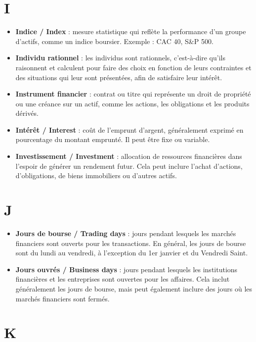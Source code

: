 \documentclass[a4paper,10pt]{article}
\begin{document}
\begin{multicols}{2}
\section*{I}
\begin{itemize}
  \item \textbf{Indice / Index} : mesure statistique qui reflète la performance d’un groupe d’actifs, comme un indice boursier. Exemple : CAC 40, S\&P 500.
  \item \textbf{Individu rationnel} : les individus sont rationnels, c'est-à-dire qu'ils raisonnent et calculent pour faire des choix en fonction de leurs contraintes et des situations qui leur sont présentées, afin de satisfaire leur intérêt.
  \item \textbf{Instrument financier} : contrat ou titre qui représente un droit de propriété ou une créance sur un actif, comme les actions, les obligations et les produits dérivés.
  \item \textbf{Intérêt / Interest} : coût de l’emprunt d’argent, généralement exprimé en pourcentage du montant emprunté. Il peut être fixe ou variable.
  \item \textbf{Investissement / Investment} : allocation de ressources financières dans l’espoir de générer un rendement futur. Cela peut inclure l’achat d’actions, d’obligations, de biens immobiliers ou d’autres actifs.
\end{itemize}

\section*{J}
\begin{itemize}
  \item \textbf{Jours de bourse / Trading days} : jours pendant lesquels les marchés financiers sont ouverts pour les transactions. En général, les jours de bourse sont du lundi au vendredi, à l’exception du 1er janvier et du Vendredi Saint.
  \item \textbf{Jours ouvrés / Business days} : jours pendant lesquels les institutions financières et les entreprises sont ouvertes pour les affaires. Cela inclut généralement les jours de bourse, mais peut également inclure des jours où les marchés financiers sont fermés.
\end{itemize}

\section*{K}


\end{multicols}
\end{document}
